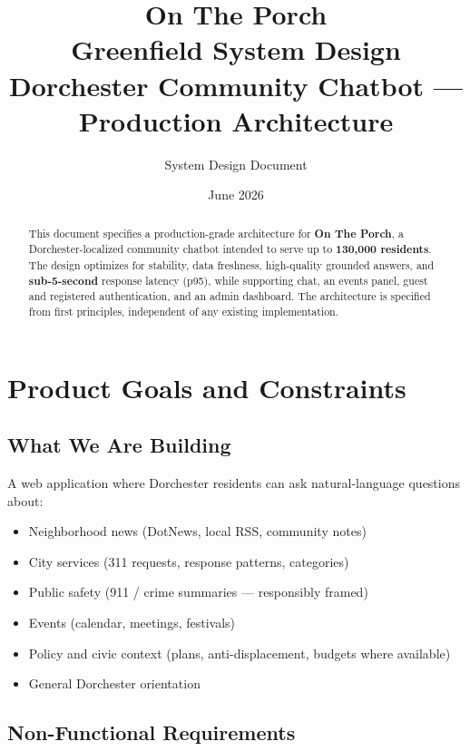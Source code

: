 \documentclass[11pt,a4paper]{article}
\title{\textbf{On The Porch}\\[0.5em]
\Large Greenfield System Design\\
\large Dorchester Community Chatbot --- Production Architecture}
\author{System Design Document}
\date{June 2026}
\begin{document}
\maketitle
\thispagestyle{fancy}

\begin{abstract}
This document specifies a production-grade architecture for \textbf{On The Porch}, a Dorchester-localized community chatbot intended to serve up to \textbf{130,000 residents}. The design optimizes for stability, data freshness, high-quality grounded answers, and \textbf{sub-5-second} response latency (p95), while supporting chat, an events panel, guest and registered authentication, and an admin dashboard. The architecture is specified from first principles, independent of any existing implementation.
\end{abstract}

\tableofcontents
\newpage

\section{Product Goals and Constraints}

\subsection{What We Are Building}
A web application where Dorchester residents can ask natural-language questions about:
\begin{itemize}[noitemsep]
  \item Neighborhood news (DotNews, local RSS, community notes)
  \item City services (311 requests, response patterns, categories)
  \item Public safety (911 / crime summaries --- responsibly framed)
  \item Events (calendar, meetings, festivals)
  \item Policy and civic context (plans, anti-displacement, budgets where available)
  \item General Dorchester orientation
\end{itemize}

\subsection{Non-Functional Requirements}
\end{document}
